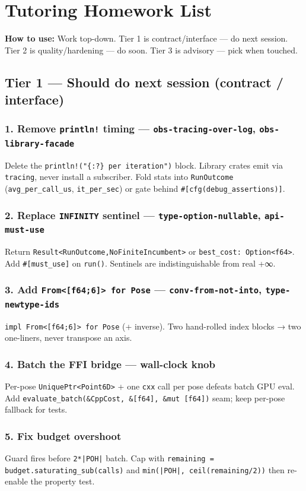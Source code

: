 \documentclass[11pt]{article}
\begin{document}
\section{Tutoring Homework List}
\label{sec:org7a49ecb}
\textbf{\textbf{How to use:}} Work top-down. Tier 1 is contract/interface — do next session. Tier 2 is quality/hardening — do soon. Tier 3 is advisory — pick when touched.
\subsection{Tier 1 — Should do next session (contract / interface)}
\label{sec:org34ebbe3}

\subsubsection{1. Remove \texttt{println!} timing — \texttt{obs-tracing-over-log}, \texttt{obs-library-facade}}
\label{sec:org2949345}
Delete the \texttt{println!("\{:?\} per iteration")} block. Library crates emit via \texttt{tracing}, never install a subscriber. Fold stats into \texttt{RunOutcome} (\texttt{avg\_per\_call\_us}, \texttt{it\_per\_sec}) or gate behind \texttt{\#[cfg(debug\_assertions)]}.
\subsubsection{2. Replace \texttt{INFINITY} sentinel — \texttt{type-option-nullable}, \texttt{api-must-use}}
\label{sec:orgca70dd3}
Return \texttt{Result<RunOutcome,NoFiniteIncumbent>} or \texttt{best\_cost: Option<f64>}. Add \texttt{\#[must\_use]} on \texttt{run()}. Sentinels are indistinguishable from real +∞.
\subsubsection{3. Add \texttt{From<[f64;6]> for Pose} — \texttt{conv-from-not-into}, \texttt{type-newtype-ids}}
\label{sec:orgdaa08b8}
\texttt{impl From<[f64;6]> for Pose} (+ inverse). Two hand-rolled index blocks → two one-liners, never transpose an axis.
\subsubsection{4. Batch the FFI bridge — wall-clock knob}
\label{sec:org25c47d4}
Per-pose \texttt{UniquePtr<Point6D>} + one \texttt{cxx} call per pose defeats batch GPU eval. Add \texttt{evaluate\_batch(\&CppCost, \&[f64], \&mut [f64])} seam; keep per-pose fallback for tests.
\subsubsection{5. Fix budget overshoot}
\label{sec:org46445b7}
Guard fires before \texttt{2*|POH|} batch. Cap with \texttt{remaining = budget.saturating\_sub(calls)} and \texttt{min(|POH|, ceil(remaining/2))} then re-enable the property test.
\end{document}
